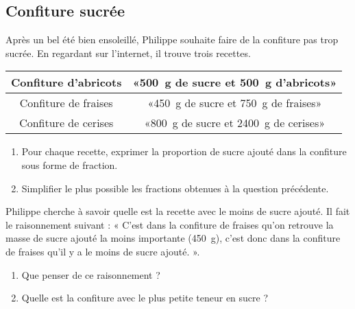 
\subsection*{Confiture sucrée}

Après un bel été bien ensoleillé, Philippe souhaite faire de la confiture pas trop sucrée. En regardant sur l'internet, il trouve trois recettes.

\begin{center}
    \begin{tabular}[]{|c|c|}
        \hline
        Confiture d'abricots& «\SI{500}{\gram} de sucre et \SI{500}{\gram} d'abricots» \\
        \hline
        Confiture de fraises&«\SI{450}{\gram} de sucre et \SI{750}{\gram} de fraises» \\
        \hline
        Confiture de cerises&  «\SI{800}{\gram} de sucre et \SI{2400}{\gram} de cerises» \\ 
        \hline
    \end{tabular}
\end{center}

\begin{enumerate}
    \item
Pour chaque recette, exprimer la proportion de sucre ajouté dans la confiture sous forme de fraction.
\item
    Simplifier le plus possible les fractions obtenues à la question précédente.
\end{enumerate}

Philippe cherche à savoir quelle est la recette avec le moins de sucre ajouté. Il fait le raisonnement suivant : « C'est dans la confiture de fraises qu'on retrouve la masse de sucre ajouté la moins importante (\SI{450}{\gram}), c'est donc dans la confiture de fraises qu'il y a le moins de sucre ajouté. ». 

\begin{enumerate}
    \item
Que penser de ce raisonnement ?
\item
Quelle est la confiture avec le plus petite teneur en sucre ?
\end{enumerate}
